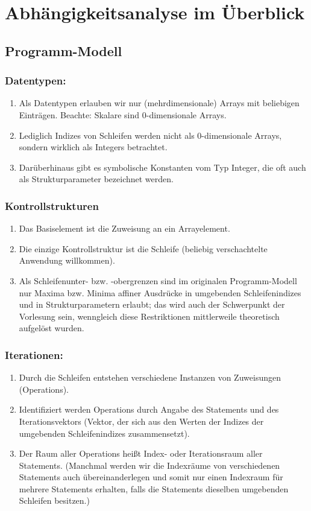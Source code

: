 
\section{Abhängigkeitsanalyse im Überblick}
\subsection{Programm-Modell}
\subsubsection{Datentypen:}
  \begin{enumerate}
  \item Als Datentypen erlauben wir nur (mehrdimensionale) Arrays
    mit beliebigen Einträgen. Beachte: Skalare sind 0-dimensionale
    Arrays.
  \item Lediglich Indizes von Schleifen werden nicht als 0-dimensionale
    Arrays, sondern wirklich als Integers betrachtet.
  \item Darüberhinaus gibt es symbolische Konstanten vom Typ Integer,
    die oft auch als Strukturparameter bezeichnet werden.
  \end{enumerate}
\subsubsection{Kontrollstrukturen}
  \begin{enumerate}
  \item Das Basiselement ist die Zuweisung an ein Arrayelement.
  \item Die einzige Kontrollstruktur ist die Schleife (beliebig
    verschachtelte Anwendung willkommen).
  \item Als Schleifenunter- bzw. -obergrenzen sind im originalen
    Programm-Modell nur Maxima bzw. Minima affiner Ausdrücke in
    umgebenden Schleifenindizes und in Strukturparametern
    erlaubt; das wird auch der Schwerpunkt der Vorlesung sein,
    wenngleich diese Restriktionen mittlerweile theoretisch aufgelöst
    wurden.
  \end{enumerate}
\subsubsection{Iterationen:}
  \begin{enumerate}
  \item Durch die Schleifen entstehen verschiedene Instanzen von
    Zuweisungen (Operations).
  \item Identifiziert werden Operations durch Angabe des Statements und
    des Iterationsvektors (Vektor, der sich aus den Werten der Indizes der
    umgebenden Schleifenindizes zusammensetzt).
  \item Der Raum aller Operations heißt Index- oder Iterationsraum aller 
    Statements. (Manchmal werden wir die Indexräume von verschiedenen
    Statements auch übereinanderlegen und somit nur einen Indexraum für
    mehrere Statements erhalten, falls die Statements dieselben
    umgebenden Schleifen besitzen.)
  \end{enumerate}
